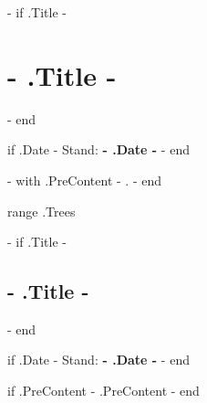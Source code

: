 \documentclass[10pt,paper=a4,ngerman,DIV=15,BCOR=0mm,%
{{ if .DocumentOptions -}}
{{ .DocumentOptions }}%
{{- end -}}
]{scrartcl}
\begin{document}
{{- if .Title -}}
\section*{ {{- .Title -}} }
{{- end }}

{{ if .Date -}}
Stand: \textbf{ {{- .Date -}} }
{{- end }}


{{- with .PreContent -}}
{{ . }}
{{- end }}



{{ range .Trees }}

{{- if .Title -}}
\subsection{ {{- .Title -}} }
{{- end }}

{{ if .Date -}}
Stand: \textbf{ {{- .Date -}} }
{{- end }}


\vspace{7mm}

{{ if .PreContent -}}
{{ .PreContent }}
{{- end }}
\end{document}
